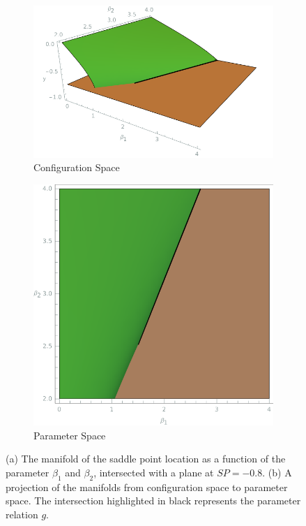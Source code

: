 \documentclass[letterpaper]{article}
\begin{document}
\begin{figure}
        \centering
        \begin{subfigure}[b]{0.35\textwidth}
            \centering
            \includegraphics[width=\textwidth]{cubic_h.png}
            \caption[]%
            {Configuration Space}    
            \label{fig:mean and std of net14}
        \end{subfigure}
        \begin{subfigure}[b]{0.2\textwidth}  
            \centering 
            \includegraphics[width=\textwidth]{cubic_h_top.png}
            \caption[]%
            {{\small Parameter Space}}    
            \label{fig:mean and std of net24}
        \end{subfigure}
    \caption{(a) The manifold of the saddle point location as a function of
    the parameter $\beta_1$ and $\beta_2$, intersected with a plane at $SP=-0.8$.
    (b) A projection of the manifolds from configuration space to parameter space.
    The intersection highlighted in black represents the parameter relation $g$.}
    \label{cubic_h}
    \end{figure}
\end{document}

